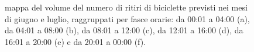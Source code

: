 \begin{figure}[htpb]
	\quad
	\caption[Mappa del volume del numero di ritiri di biciclette previsti nei mesi di giugno e luglio, raggruppati per fasce orarie]{mappa del volume del numero di ritiri di biciclette previsti nei mesi di giugno e luglio, raggruppati per fasce orarie: da 00:01 a 04:00 (a), da 04:01 a 08:00 (b), da 08:01 a 12:00 (c), da 12:01 a 16:00 (d), da 16:01 a 20:00 (e) e da 20:01 a 00:00 (f).}
	\label{Krignig_giugno_e_lugio}
\end{figure}

